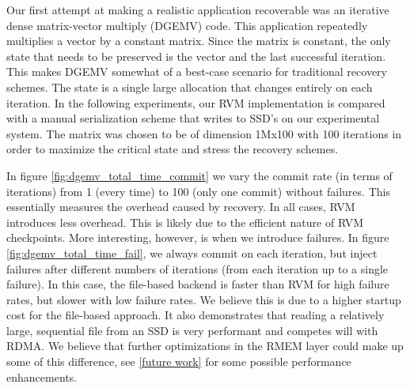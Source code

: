 Our first attempt at making a realistic application recoverable was an iterative
dense matrix-vector multiply (DGEMV) code. This application repeatedly
multiplies a vector by a constant matrix. Since the matrix is constant, the
only state that needs to be preserved is the vector and the last successful
iteration. This makes DGEMV somewhat of a best-case scenario for traditional
recovery schemes. The state is a single large allocation that changes entirely
on each iteration. In the following experiments, our RVM implementation is
compared with a manual serialization scheme that writes to SSD's on our
experimental system. The matrix was chosen to be of dimension 1Mx100 with 100
iterations in order to maximize the critical state and stress the recovery
schemes.


In figure \ref{fig:dgemv_total_time_commit} we vary the commit rate (in terms of
iterations) from 1 (every time) to 100 (only one commit) without failures. This
essentially measures the overhead caused by recovery. In all cases, RVM
introduces less overhead. This is likely due to the efficient nature of RVM
checkpoints. More interesting, however, is when we introduce failures. In figure
\ref{fig:dgemv_total_time_fail}, we always commit on each iteration, but inject
failures after different numbers of iterations (from each iteration up to a
single failure). In this case, the file-based backend is faster than RVM for
high failure rates, but slower with low failure rates. We believe this is due to
a higher startup cost for the file-based approach. It also demonstrates that
reading a relatively large, sequential file from an SSD is very performant and
competes will with RDMA. We believe that further optimizations in the RMEM layer
could make up some of this difference, see \ref{future work} for some possible
performance enhancements.

